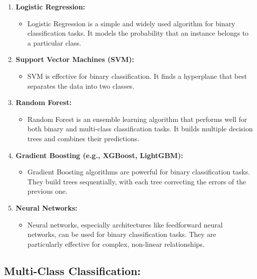 \documentclass[
]{book}
\providecommand{\tightlist}{%
  \setlength{\itemsep}{0pt}\setlength{\parskip}{0pt}}
\begin{document}
\begin{enumerate}
\def\labelenumi{\arabic{enumi}.}
\tightlist
\item
  \textbf{Logistic Regression:}

  \begin{itemize}
  \tightlist
  \item
    Logistic Regression is a simple and widely used algorithm for binary classification tasks. It models the probability that an instance belongs to a particular class.
  \end{itemize}
\item
  \textbf{Support Vector Machines (SVM):}

  \begin{itemize}
  \tightlist
  \item
    SVM is effective for binary classification. It finds a hyperplane that best separates the data into two classes.
  \end{itemize}
\item
  \textbf{Random Forest:}

  \begin{itemize}
  \tightlist
  \item
    Random Forest is an ensemble learning algorithm that performs well for both binary and multi-class classification tasks. It builds multiple decision trees and combines their predictions.
  \end{itemize}
\item
  \textbf{Gradient Boosting (e.g., XGBoost, LightGBM):}

  \begin{itemize}
  \tightlist
  \item
    Gradient Boosting algorithms are powerful for binary classification tasks. They build trees sequentially, with each tree correcting the errors of the previous one.
  \end{itemize}
\item
  \textbf{Neural Networks:}

  \begin{itemize}
  \tightlist
  \item
    Neural networks, especially architectures like feedforward neural networks, can be used for binary classification tasks. They are particularly effective for complex, non-linear relationships.
  \end{itemize}
\end{enumerate}

\hypertarget{multi-class-classification}{%
\subsection{Multi-Class Classification:}\label{multi-class-classification}}
\end{document}

